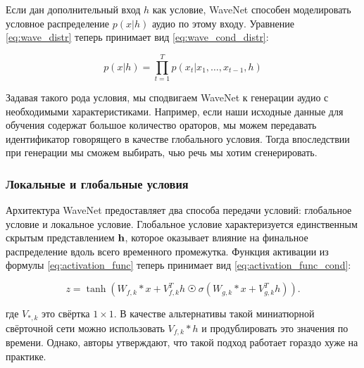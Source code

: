 \documentclass[../diploma.tex]{subfiles}
\begin{document}
Если дан дополнительный вход $h$ как условие, WaveNet способен моделировать условное распределение $p(x|h)$ аудио по этому входу. Уравнение \ref{eq:wave_distr} теперь принимает вид \ref{eq:wave_cond_distr}:

\begin{equation} \label{eq:wave_cond_distr}
p(x|h) = \prod^{T}_{t=1}{p(x_{t}|x_1, \dots, x_{t-1}, h)}
\end{equation}

Задавая такого рода условия, мы сподвигаем WaveNet к генерации аудио с необходимыми характеристиками. Например, если наши исходные данные для обучения содержат большое количество ораторов, мы можем передавать идентификатор говорящего в качестве глобального условия. Тогда впоследствии при генерации мы сможем выбирать, чью речь мы хотим сгенерировать.


\subsubsection{Локальные и глобальные условия}
Архитектура WaveNet предоставляет два способа передачи условий: глобальное условие и локальное условие.
Глобальное условие характеризуется единственным скрытым представлением $\bf{h}$, которое оказывает влияние на
финальное распределение вдоль всего временного промежутка. 
Функция активации из формулы \ref{eq:activation_func} теперь принимает вид \ref{eq:activation_func_cond}:


\begin{equation} \label{eq:activation_func_cond}
z = \tanh(W_{f,k} * x + V_{f,k}^T h~\astrosun~\sigma (W_{g,k} * x + V_{g,k}^T h)).
\end{equation}

где $V_{*,k}$ это свёртка $1 \times 1$. В качестве альтернативы такой миниатюрной свёрточной сети можно
использовать $V_{f,k} * h$ и продублировать это значения по времени. Однако, авторы утверждают, 
что такой подход работает гораздо хуже на практике.  
\end{document}
